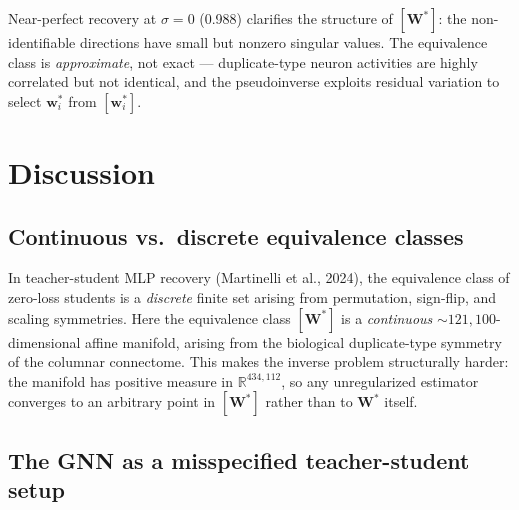 \documentclass[11pt,a4paper]{article}
\begin{document}
Near-perfect recovery at $\sigma=0$ (0.988) clarifies the structure of
$[\mathbf{W}^*]$: the non-identifiable directions have small but nonzero singular
values. The equivalence class is \emph{approximate}, not exact --- duplicate-type
neuron activities are highly correlated but not identical, and the pseudoinverse
exploits residual variation to select $\mathbf{w}_i^*$ from $[\mathbf{w}_i^*]$.

\section{Discussion}

\subsection{Continuous vs.\ discrete equivalence classes}

In teacher-student MLP recovery (Martinelli et al., 2024), the equivalence class
of zero-loss students is a \emph{discrete} finite set arising from permutation,
sign-flip, and scaling symmetries. Here the equivalence class $[\mathbf{W}^*]$ is
a \emph{continuous} $\sim 121{,}100$-dimensional affine manifold, arising from the
biological duplicate-type symmetry of the columnar connectome. This makes the
inverse problem structurally harder: the manifold has positive measure in
$\mathbb{R}^{434{,}112}$, so any unregularized estimator converges to an arbitrary
point in $[\mathbf{W}^*]$ rather than to $\mathbf{W}^*$ itself.

\subsection{The GNN as a misspecified teacher-student setup}
\end{document}
